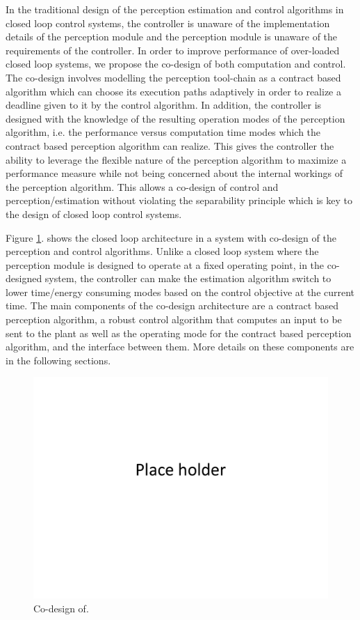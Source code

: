 In the traditional design of the perception estimation and control algorithms in closed loop control systems, the controller is unaware of the implementation details of the perception module and the perception module is unaware of the requirements of the controller. In order to improve performance of over-loaded closed loop systems, we propose the co-design of both computation and control. The co-design involves modelling the perception tool-chain as a contract based algorithm which can choose its execution paths adaptively in order to realize a deadline given to it by the control algorithm. In addition, the controller is designed with the knowledge of the resulting operation modes of the perception algorithm, i.e. the performance versus computation time modes which the contract based perception algorithm can realize. This gives the controller the ability to leverage the flexible nature of the perception algorithm to maximize a performance measure while not being concerned about the internal workings of the perception algorithm. This allows a co-design of control and perception/estimation without violating the separability principle which is key to the design of closed loop control systems.

Figure \ref{fig:codesignarch}. shows the closed loop architecture in a system with co-design of the perception and control algorithms. Unlike a closed loop system where the perception module is designed to operate at a fixed operating point, in the co-designed system, the controller can make the estimation algorithm switch to lower time/energy consuming modes based on the control objective at the current time. The main components of the co-design architecture are a contract based perception algorithm, a robust control algorithm that computes an input to be sent to the plant as well as the operating mode for the contract based perception algorithm, and the interface between them. More details on these components are in the following sections.



\begin{figure}[t]
	\centering
	\includegraphics[width=0.7\linewidth]{figures/placeHolder}
	\caption{Co-design of.}
	\label{fig:codesignarch}
\end{figure}

